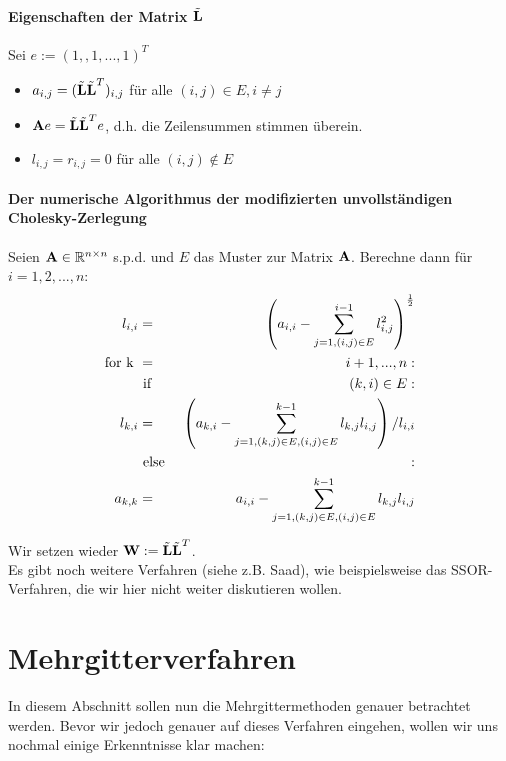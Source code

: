 \subsubsection{Eigenschaften der Matrix $\tilde{{\textbf{L}}}$}\label{sss.Eigenschaften L MCZ}

Sei $e := (1,,1,...,1)^{T}$

\begin{itemize}
\item $a_{i,j} = (\tilde{{\textbf{L}}} \tilde{{\textbf{L}}}^{T})_{i,j}$ für alle $(i,j) \in E, i \ne j$
\item ${\textbf{A}} e = \tilde{{\textbf{L}}} \tilde{{\textbf{L}}}^{T} e$, d.h. die Zeilensummen stimmen überein.
\item $l_{i,j} = r_{i,j} = 0$ für alle $(i,j) \notin E$
\end{itemize}

\subsubsection{Der numerische Algorithmus der modifizierten unvollständigen Cholesky-Zerlegung}\label{sss.Algorithmus MUCZ}

Seien ${\textbf{A}} \in \mathbb{R}^{n \times n}$ s.p.d. und $E$ das Muster zur Matrix ${\textbf{A}}$. Berechne dann für $i=1,2,...,n$:
\begin{eqnarray}
l_{i,i} &=& \left( a_{i,i} - \sum^{i-1}_{j=1,(i,j) \in E} l_{i,j}^{2} \right)^{\frac {1} {2}} \\
\textnormal{for k } &=& i+1,...,n: \\
&\textnormal{ if }& (k,i) \in E: \\
l_{k,i} &=& \left( a_{k,i} - \sum^{k-1}_{j=1,(k,j) \in E, (i,j) \in E} l_{k,j} l_{i,j} \right) / l_{i,i} \\
&\textnormal{ else }&:\\
a_{k,k} &=& a_{i,i} - \sum^{k-1}_{j=1,(k,j) \in E, (i,j) \in E} l_{k,j} l_{i,j}
\end{eqnarray}

Wir setzen wieder ${\textbf{W}} := \tilde{{\textbf{L}}} \tilde{{\textbf{L}}}^{T}$. \\
Es gibt noch weitere Verfahren (siehe z.B. Saad), wie beispielsweise das SSOR-Verfahren, die wir hier nicht weiter diskutieren wollen.
\chapter{Mehrgitterverfahren}\label{c.Mehrgitterverfahren}

In diesem Abschnitt sollen nun die Mehrgittermethoden genauer betrachtet werden. Bevor wir jedoch genauer auf dieses Verfahren eingehen, wollen wir uns nochmal einige Erkenntnisse klar machen:

